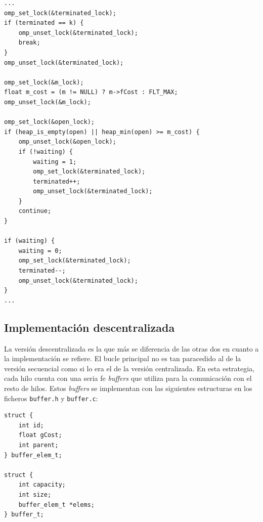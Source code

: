 \documentclass[a4paper,12pt]{article}
\begin{document}
{\lstset{frame=trbl,
         numbers=left,
         title=Detección de terminación en A* centralizado,
         label=terminacion}
\begin{lstlisting}
...
omp_set_lock(&terminated_lock);
if (terminated == k) {
    omp_unset_lock(&terminated_lock);
    break;
}
omp_unset_lock(&terminated_lock);

omp_set_lock(&m_lock);
float m_cost = (m != NULL) ? m->fCost : FLT_MAX;
omp_unset_lock(&m_lock);

omp_set_lock(&open_lock);
if (heap_is_empty(open) || heap_min(open) >= m_cost) {
    omp_unset_lock(&open_lock);
    if (!waiting) {
        waiting = 1;
        omp_set_lock(&terminated_lock);
        terminated++;
        omp_unset_lock(&terminated_lock);
    }
    continue;
}

if (waiting) {
    waiting = 0;
    omp_set_lock(&terminated_lock);
    terminated--;
    omp_unset_lock(&terminated_lock);
}
...
\end{lstlisting}
}

\clearpage

\subsection{Implementación descentralizada}

La versión descentralizada es la que más se diferencia de las otras dos en cuanto a la implementación se refiere. El bucle principal no es tan paracedido al de la versión secuencial como si lo era el de la versión centralizada. En esta estrategia, cada hilo cuenta con una seria fe \textit{buffers} que utiliza para la comunicación con el resto de hilos. Estos \textit{buffers} se implementan con las siguientes estructuras en los ficheros \verb|buffer.h| y \verb|buffer.c|:

\begin{lstlisting}
struct {
    int id;
    float gCost;
    int parent;
} buffer_elem_t;

struct {
    int capacity;
    int size;
    buffer_elem_t *elems;
} buffer_t;
\end{lstlisting}
\end{document}
